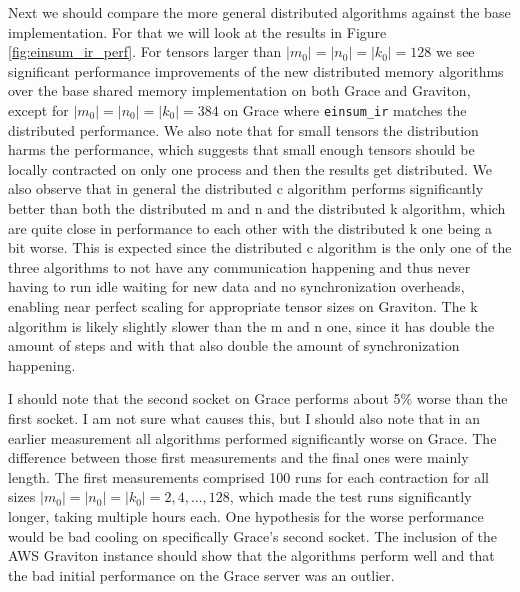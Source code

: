 Next we should compare the more general distributed algorithms against the base implementation.
For that we will look at the results in Figure \ref{fig:einsum_ir_perf}.
For tensors larger than $|m_0|=|n_0|=|k_0|=128$ we see significant performance improvements of the new distributed memory algorithms over the base shared memory implementation on both Grace and Graviton, except for $|m_0|=|n_0|=|k_0|=384$ on Grace where \texttt{einsum\_ir} matches the distributed performance.
We also note that for small tensors the distribution harms the performance, which suggests that small enough tensors should be locally contracted on only one process and then the results get distributed.
We also observe that in general the distributed c algorithm performs significantly better than both the distributed m and n and the distributed k algorithm, which are quite close in performance to each other with the distributed k one being a bit worse.
This is expected since the distributed c algorithm is the only one of the three algorithms to not have any communication happening and thus never having to run idle waiting for new data and no synchronization overheads, enabling near perfect scaling for appropriate tensor sizes on Graviton.
The k algorithm is likely slightly slower than the m and n one, since it has double the amount of steps and with that also double the amount of synchronization happening.


I should note that the second socket on Grace performs about 5\% worse than the first socket.
I am not sure what causes this, but I should also note that in an earlier measurement all algorithms performed significantly worse on Grace.
The difference between those first measurements and the final ones were mainly length.
The first measurements comprised 100 runs for each contraction for all sizes $|m_0|=|n_0|=|k_0|=2,4,...,128$, which made the test runs significantly longer, taking multiple hours each.
One hypothesis for the worse performance would be bad cooling on specifically Grace's second socket.
The inclusion of the AWS Graviton instance should show that the algorithms perform well and that the bad initial performance on the Grace server was an outlier.


